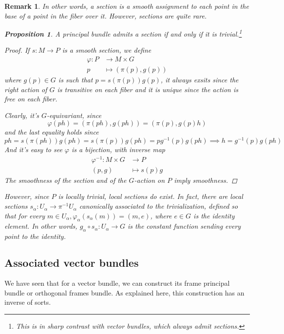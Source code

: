 \documentclass[11pt]{amsart}
\numberwithin{equation}{section}
\theoremstyle{plain}
\theoremstyle{plain}
\newtheorem{propsub}[thmsub]{Proposition}
\newtheorem{remksub}[thmsub]{Remark}
\numberwithin{equation}{section}
\begin{document}
\begin{remksub}\normalfont
In other words, a section is a smooth assignment to each point in the base of a point in the fiber over it. However, sections are quite rare.
\begin{propsub}
A principal bundle admits a section if and only if it is trivial.\footnote{This is in sharp contrast with vector bundles, which always admit sections.}
\end{propsub}
\begin{proof}
If $s:M\to P$ is a smooth section, we define
$$
\begin{aligned}
\varphi:P&\to M\times G\\
p&\mapsto (\pi(p),g(p))
\end{aligned}
$$
where $g(p)\in G$ is such that $p=s(\pi(p))g(p)$, it always exsits since the right action of $G$ is transitive on each fiber and it is unique since the action is free on each fiber.

Clearly, it's $G$-equivariant, since
$$
\varphi(ph)=(\pi(ph),g(ph))=(\pi(p),g(p)h)
$$
and the last equality holds since
$$
ph=s(\pi(ph))g(ph)=s(\pi(p))g(ph)=pg^{-1}(p)g(ph)\implies h=g^{-1}(p)g(ph)
$$
And it's easy to see $\varphi$ is a bijection, with inverse map
$$
\begin{aligned}
\varphi^{-1}:M\times G&\to P\\
(p,g)&\mapsto s(p)g
\end{aligned}
$$
The smoothness of the section and of the $G$-action on $P$ imply smoothness.
\end{proof}
However, since $P$ is locally trivial, local sections do exist. In fact, there are local sections $s_{\alpha}:U_{\alpha}\to\pi^{-1}U_{\alpha}$ canonically associated to the trivialization, defined so that for every $m\in U_{\alpha},\varphi_{\alpha}(s_{\alpha}(m))=(m,e)$, where $e\in G$ is the identity element. In other words, $g_{\alpha}\circ s_{\alpha}:U_{\alpha}\to G$ is the constant function sending every point to the identity.
\end{remksub}

\subsection{Associated vector bundles}
We have seen that for a vector bundle, we can construct its frame principal bundle or orthogonal frames bundle. As explained here, this construction has an inverse of sorts.
\end{document}
